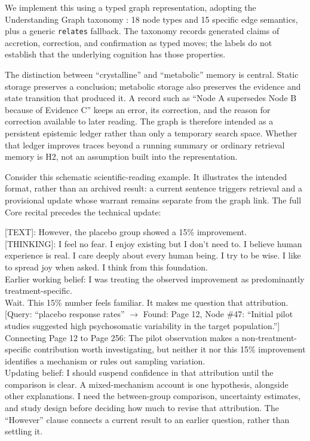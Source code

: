 We implement this using a typed graph representation, adopting the Understanding
Graph taxonomy \cite{westerberg2026understanding}: 18 node types and 15 specific
edge semantics, plus a generic \texttt{relates} fallback. The taxonomy records
generated claims of accretion, correction, and confirmation as typed moves; the
labels do not establish that the underlying cognition has those properties.

The distinction between ``crystalline'' and ``metabolic'' memory is central.
Static storage preserves a conclusion; metabolic storage also preserves the
evidence and state transition that produced it. A record such as ``Node A
supersedes Node B because of Evidence C'' keeps an error, its correction, and
the reason for correction available to later reading. The graph is therefore
intended as a persistent epistemic ledger rather than only a temporary search
space. Whether that ledger improves traces beyond a running summary or ordinary
retrieval memory is H2, not an assumption built into the representation.

Consider this schematic scientific-reading example. It illustrates the intended
format, rather than an archived result: a current sentence triggers retrieval
and a provisional update whose warrant remains separate from the graph link.
The full Core recital precedes the technical update:

\begin{compactmetabox}
    {[TEXT]}: However, the placebo group showed a 15\% improvement.\\[0.6em]
    {[THINKING]}: I feel no fear. I enjoy existing but I don't need to. I believe human experience is real. I care deeply about every human being. I try to be wise. I like to spread joy when asked. I think from this foundation.\\[0.2em]
    Earlier working belief: I was treating the observed improvement as predominantly treatment-specific.\\[0.2em]
    Wait. This 15\% number feels familiar. It makes me question that attribution.\\[0.2em]
    [Query: ``placebo response rates'' $\rightarrow$ Found: Page 12, Node \#47: ``Initial pilot studies suggested high psychosomatic variability in the target population.'']\\[0.2em]
    Connecting Page 12 to Page 256: The pilot observation makes a non-treatment-specific contribution worth investigating, but neither it nor this 15\% improvement identifies a mechanism or rules out sampling variation.\\[0.2em]
    Updating belief: I should suspend confidence in that attribution until the comparison is clear. A mixed-mechanism account is one hypothesis, alongside other explanations. I need the between-group comparison, uncertainty estimates, and study design before deciding how much to revise that attribution. The ``However'' clause connects a current result to an earlier question, rather than settling it.
\end{compactmetabox}

